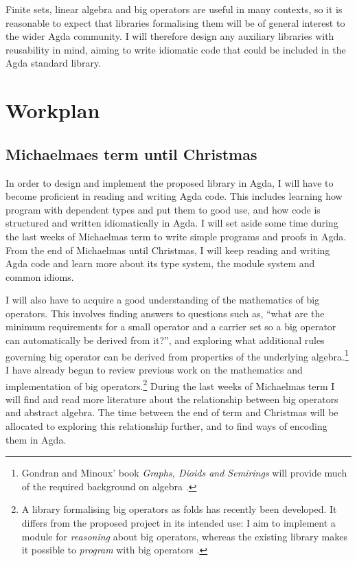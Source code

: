 \documentclass[a4paper]{scrartcl}
\begin{document}
Finite sets, linear algebra and big operators are useful in many contexts, so it is reasonable to expect that libraries formalising them will be of general interest to the wider Agda community. I will therefore design any auxiliary libraries with reusability in mind, aiming to write idiomatic code that could be included in the Agda standard library.

\section{Workplan}
\label{workplan}

\subsection{Michaelmaes term until Christmas}

In order to design and implement the proposed library in Agda, I will have to become proficient in reading and writing Agda code. This includes learning how program with dependent types and put them to good use, and how code is structured and written idiomatically in Agda. I will set aside some time during the last weeks of Michaelmas term to write simple programs and proofs in Agda. From the end of Michaelmas until Christmas, I will keep reading and writing Agda code and learn more about its type system, the module system and common idioms.

I will also have to acquire a good understanding of the mathematics of big operators. This involves finding answers to questions such as, \enquote{what are the minimum requirements for a small operator and a carrier set so a big operator can automatically be derived from it?}, and exploring what additional rules governing big operator can be derived from properties of the underlying algebra.\footnote{Gondran and Minoux' book \emph{Graphs, Dioids and Semirings} will provide much of the required background on algebra \autocite{gondran_graphs_2008}.} I have already begun to review previous work on the mathematics and implementation of big operators.\footnote{A library formalising big operators as folds has recently been developed. It differs from the proposed project in its intended use: I aim to implement a module for \emph{reasoning} about big operators, whereas the existing library makes it possible to \emph{program} with big operators \autocite{gustafsson_foldable_2014}.} During the last weeks of Michaelmas term I will find and read more literature about the relationship between big operators and abstract algebra. The time between the end of term and Christmas will be allocated to exploring this relationship further, and to find ways of encoding them in Agda.
\end{document}
